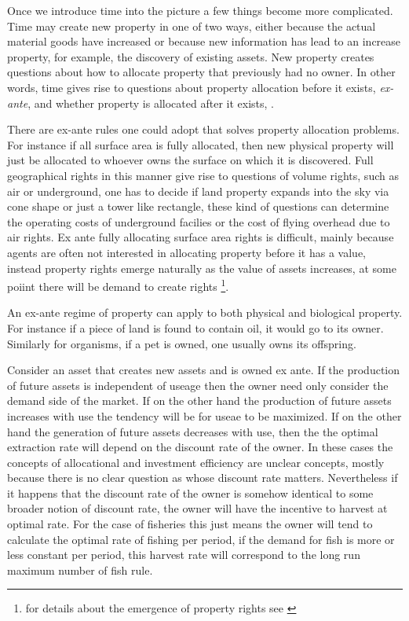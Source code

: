\documentclass[12pt]{article}
\numberwithin{equation}{section}
\begin{document}
Once we introduce time into the picture a few things become more complicated. Time may create new property in one of two ways, either because the actual material goods have increased or because new information has lead to an increase property, for example, the discovery of existing assets. New property creates questions about how to allocate property that previously had no owner. In other words, time gives rise to questions about property allocation before it exists, \textit{ex-ante}, and whether property is allocated after it exists, . 

There are ex-ante rules one could adopt that solves property allocation problems.  For instance if all surface area is fully allocated, then new physical property will just be allocated to whoever owns the surface on which it is discovered. Full geographical rights in this manner give rise to questions of volume rights, such as air or underground, one has to decide if land property expands into the sky via cone shape or just a tower like rectangle, these kind of questions can determine the operating costs of underground facilies or the cost of flying overhead due to air rights.  Ex ante fully allocating surface area rights is  difficult, mainly because agents are often not interested in allocating property before it has a value, instead property rights emerge naturally as the value of assets increases, at some poiint there will be demand to create rights \footnote{for details about the emergence of property rights see \cite{Alchian1973}}. 

An ex-ante regime of property can apply to both physical and biological property. For instance if a piece of land is found to contain oil, it would go to its owner. Similarly for organisms, if a pet is owned, one usually owns its offspring.

Consider an asset that creates new assets and is owned ex ante. If the production of future assets is independent of useage then the owner need only consider the demand side of the market. If on the other hand the production of future assets increases with use the tendency will be for useae to be maximized. If on the other hand the generation of future assets decreases with use, then the the optimal extraction rate will depend on the discount rate of the owner. In these cases the concepts of allocational and investment efficiency are unclear concepts, mostly because there is no clear question as whose discount rate matters. Nevertheless if it happens that the discount rate of the owner is somehow identical to some broader notion of discount rate, the owner will have the incentive to harvest at optimal rate. For the case of fisheries this just means the owner will tend to calculate the optimal rate of fishing per period, if the demand for fish is more or less constant per period, this harvest rate will correspond to the long run maximum number of fish rule.  
\end{document}
